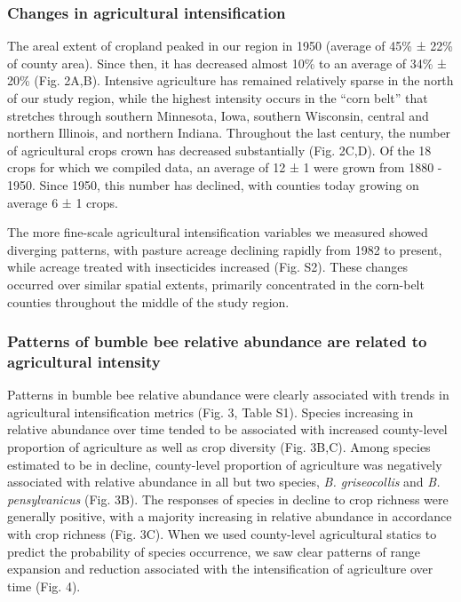 \documentclass[11pt,]{article}
\begin{document}
\hypertarget{changes-in-agricultural-intensification}{%
\subsubsection{Changes in agricultural
intensification}\label{changes-in-agricultural-intensification}}

The areal extent of cropland peaked in our region in 1950 (average of
45\% ± 22\% of county area). Since then, it has decreased almost 10\% to
an average of 34\% ± 20\% (Fig. 2A,B). Intensive agriculture has
remained relatively sparse in the north of our study region, while the
highest intensity occurs in the ``corn belt'' that stretches through
southern Minnesota, Iowa, southern Wisconsin, central and northern
Illinois, and northern Indiana. Throughout the last century, the number
of agricultural crops crown has decreased substantially (Fig. 2C,D). Of
the 18 crops for which we compiled data, an average of 12 ± 1 were grown
from 1880 - 1950. Since 1950, this number has declined, with counties
today growing on average 6 ± 1 crops.

The more fine-scale agricultural intensification variables we measured
showed diverging patterns, with pasture acreage declining rapidly from
1982 to present, while acreage treated with insecticides increased (Fig.
S2). These changes occurred over similar spatial extents, primarily
concentrated in the corn-belt counties throughout the middle of the
study region.

\hypertarget{patterns-of-bumble-bee-relative-abundance-are-related-to-agricultural-intensity}{%
\subsubsection{Patterns of bumble bee relative abundance are related to
agricultural
intensity}\label{patterns-of-bumble-bee-relative-abundance-are-related-to-agricultural-intensity}}

Patterns in bumble bee relative abundance were clearly associated with
trends in agricultural intensification metrics (Fig. 3, Table S1).
Species increasing in relative abundance over time tended to be
associated with increased county-level proportion of agriculture as well
as crop diversity (Fig. 3B,C). Among species estimated to be in decline,
county-level proportion of agriculture was negatively associated with
relative abundance in all but two species, \emph{B. griseocollis} and
\emph{B. pensylvanicus} (Fig. 3B). The responses of species in decline
to crop richness were generally positive, with a majority increasing in
relative abundance in accordance with crop richness (Fig. 3C). When we
used county-level agricultural statics to predict the probability of
species occurrence, we saw clear patterns of range expansion and
reduction associated with the intensification of agriculture over time
(Fig. 4).
\end{document}
